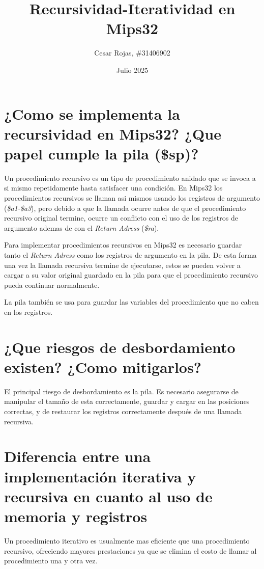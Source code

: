 \documentclass[titlepage]{article}
\title{Recursividad-Iteratividad en Mips32}
\author{Cesar Rojas, \#31406902}
\date{Julio 2025}
\begin{document}
\maketitle

\section*{¿Como se implementa la recursividad en Mips32? ¿Que papel cumple la pila (\$sp)?}

Un procedimiento recursivo es un tipo de procedimiento anidado que se invoca a si mismo repetidamente hasta satisfacer una condición. En Mips32 los procedimientos recursivos se llaman asi mismos usando los registros de argumento (\emph{\$a1-\$a3}), pero debido a que la llamada ocurre antes de que el procedimiento recursivo original termine, ocurre un conflicto con el uso de los registros de argumento ademas de con el \emph{Return Adress} (\emph{\$ra}).

Para implementar procedimientos recursivos en Mips32 es necesario guardar tanto el \emph{Return Adress} como los registros de argumento en la pila. De esta forma una vez la llamada recursiva termine de ejecutarse, estos se pueden volver a cargar a su valor original guardado en la pila para que el procedimiento recursivo pueda continuar normalmente.

La pila también se usa para guardar las variables del procedimiento que no caben en los registros.

\section*{¿Que riesgos de desbordamiento existen? ¿Como mitigarlos?}

El principal riesgo de desbordamiento es la pila. Es necesario asegurarse de manipular el tamaño de esta correctamente, guardar y cargar en las posiciones correctas, y de restaurar los registros correctamente después de una llamada recursiva.

\section*{Diferencia entre una implementación iterativa y recursiva en cuanto al uso de memoria y registros}

Un procedimiento iterativo es usualmente mas eficiente que una procedimiento recursivo, ofreciendo mayores prestaciones ya que se elimina el costo de llamar al procedimiento una y otra vez. 
\end{document}
